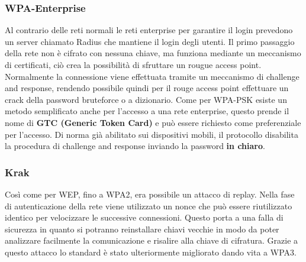 \subsubsection{WPA-Enterprise}
Al contrario delle reti normali le reti enterprise per garantire il login prevedono un server chiamato Radius che mantiene il login degli utenti. Il primo passaggio della rete non è cifrato con nessuna chiave, ma funziona mediante un meccanismo di certificati, ciò crea la possibilità di sfruttare un rougue access point.
Normalmente la connessione viene effettuata tramite un meccanismo di challenge and response, rendendo possibile quindi per il rouge access point effettuare un crack della password bruteforce o a dizionario. Come per WPA-PSK esiste un metodo semplificato anche per l'accesso a una rete enterprise, questo prende il nome di \textbf{GTC (Generic Token Card)} e può essere richiesto come preferenziale per l'accesso. Di norma già abilitato sui dispositivi mobili, il protocollo disabilita la procedura di challenge and response inviando la password \textbf{in chiaro}.

\subsubsection{Krak}
Così come per WEP, fino a WPA2, era possibile un attacco di replay. Nella fase di autenticazione della rete viene utilizzato un nonce che può essere riutilizzato identico per velocizzare le successive connessioni. Questo porta a una falla di sicurezza in quanto si potranno reinstallare chiavi vecchie in modo da poter analizzare facilmente la comunicazione e risalire alla chiave di cifratura. Grazie a questo attacco lo standard è stato ulteriormente migliorato dando vita a WPA3.